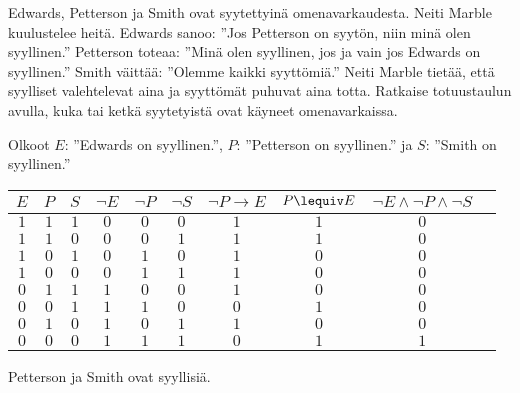 \begin{tehtavasivu}
\begin{tehtava}
     Edwards, Petterson ja Smith ovat syytettyinä omenavarkaudesta. Neiti Marble kuulustelee heitä. Edwards sanoo: ''Jos Petterson on syytön, niin minä olen syyllinen.'' Petterson toteaa: ''Minä olen syyllinen, jos ja vain jos Edwards on syyllinen.'' Smith väittää: ''Olemme kaikki syyttömiä.'' Neiti Marble tietää, että syylliset valehtelevat aina ja syyttömät puhuvat aina totta. Ratkaise totuustaulun avulla, kuka tai ketkä syytetyistä ovat käyneet omenavarkaissa.
    \begin{vastaus}
    Olkoot $E$: ''Edwards on syyllinen.'', $P$: ''Petterson on syyllinen.'' ja $S$: ''Smith on syyllinen.''
            \begin{center}
		    \begin{tabular}{|c|c|c|c|c|c|c|c|c|c|}\hline
		    $E$ & $P$ & $S$ & $\lnot E$ & $\lnot P$ & $\lnot S$ & $\lnot P\to E$ & $P\lequiv E$ & $\lnot E\land \lnot P \land \lnot S$ \\ \hline
		    $1$ & $1$ & $1$ & $0$ & $0$ & $0$ & $1$ & $1$ & $0$ \\ %
		    $1$ & $1$ & $0$ & $0$ & $0$ & $1$ & $1$ & $1$ & $0$ \\
		    $1$ & $0$ & $1$ & $0$ & $1$ & $0$ & $1$ & $0$ & $0$ \\
		    $1$ & $0$ & $0$ & $0$ & $1$ & $1$ & $1$ & $0$ & $0$ \\
		    $0$ & $1$ & $1$ & $1$ & $0$ & $0$ & $1$ & $0$ & $0$ \\
		    $0$ & $0$ & $1$ & $1$ & $1$ & $0$ & $0$ & $1$ & $0$ \\
		    $0$ & $1$ & $0$ & $1$ & $0$ & $1$ & $1$ & $0$ & $0$ \\
		    $0$ & $0$ & $0$ & $1$ & $1$ & $1$ & $0$ & $1$ & $1$ \\ \hline
\end{tabular}
\end{center}
    Petterson ja Smith ovat syyllisiä.  %
    \end{vastaus}
    
\end{tehtava}


\end{tehtavasivu}
